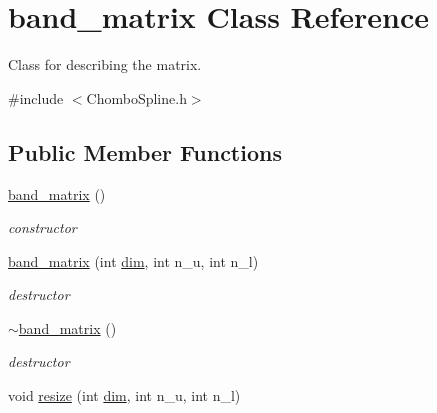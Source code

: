 \hypertarget{classband__matrix}{}\section{band\+\_\+matrix Class Reference}
\label{classband__matrix}


Class for describing the matrix.  




{\ttfamily \#include $<$Chombo\+Spline.\+h$>$}

\subsection*{Public Member Functions}
\begin{DoxyCompactItemize}
\item 
\mbox{\label{classband__matrix_a6c5729451260e53bdc0988d818b6ab3b}} 
\hyperlink{classband__matrix_a6c5729451260e53bdc0988d818b6ab3b}{band\+\_\+matrix} ()
\begin{DoxyCompactList}\small\item\em constructor \end{DoxyCompactList}\item 
\mbox{\label{classband__matrix_a4168e9aecf418e3471bddb516d3f1862}} 
\hyperlink{classband__matrix_a4168e9aecf418e3471bddb516d3f1862}{band\+\_\+matrix} (int \hyperlink{classband__matrix_ad8ef88cdb013c85d2e90c117c7e16981}{dim}, int n\+\_\+u, int n\+\_\+l)
\begin{DoxyCompactList}\small\item\em destructor \end{DoxyCompactList}\item 
\mbox{\label{classband__matrix_aa563a8b89b2bac6c99df710cfba880b1}} 
\hyperlink{classband__matrix_aa563a8b89b2bac6c99df710cfba880b1}{$\sim$band\+\_\+matrix} ()
\begin{DoxyCompactList}\small\item\em destructor \end{DoxyCompactList}\item 
\mbox{\label{classband__matrix_a1aa747b2d152bebd3d7840c81f1a1bd4}} 
void \hyperlink{classband__matrix_a1aa747b2d152bebd3d7840c81f1a1bd4}{resize} (int \hyperlink{classband__matrix_ad8ef88cdb013c85d2e90c117c7e16981}{dim}, int n\+\_\+u, int n\+\_\+l)

\end{DoxyCompactItemize}
